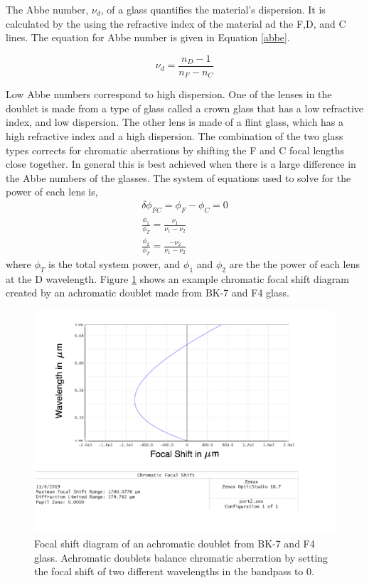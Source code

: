 The Abbe number, $\nu_d$, of a glass quantifies the material's dispersion. It is calculated by the using the refractive index of the material ad the F,D, and C lines. The equation for Abbe number is given in Equation \ref{abbe}. 

\begin{equation}
    \nu_d=\frac{n_D-1}{n_F-n_C}
    \label{abbe}
\end{equation}

Low Abbe numbers correspond to high dispersion. One of the lenses in the doublet is made from a type of glass called a crown glass that has a low refractive index, and low dispersion. The other lens is made of a flint glass, which has a high refractive index and a high dispersion. The combination of the two glass types corrects for chromatic aberrations by shifting the F and C focal lengths close together. In general this is best achieved when there is a large difference in the Abbe numbers of the glasses. The system of equations used to solve for the power of each lens is,
%
\begin{eqnarray}
       \delta \phi_{FC}=\phi_F-\phi_C=0 \\
       \frac{\phi_{1}}{\phi_T}= \frac{\nu_1}{\nu_1-\nu_2} \\
       \frac{\phi_{2}}{\phi_T}= \frac{-\nu_2}{\nu_1-\nu_2}\nonumber
\end{eqnarray}
where $\phi_T$ is the total system power, and $\phi_1$ and $\phi_2$ are the the power of each lens at the D wavelength. Figure \ref{fig:doublet} shows an example chromatic focal shift diagram created by an achromatic doublet made from BK-7 and F4 glass. 

\begin{figure}
    \centering
    \includegraphics[width=.8\textwidth]{Chapter Materials/Chapter Three Materials/doubletfocalshift.png}
    \caption{Focal shift diagram of an achromatic doublet from BK-7 and F4 glass. Achromatic doublets balance chromatic aberration by setting the focal shift of two different wavelengths in the bandpass to 0.}
    \label{fig:doublet}
\end{figure}

